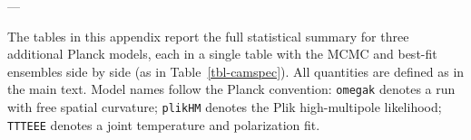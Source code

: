 \documentclass[apj,twocolumn,numberedappendix]{openjournal}
\begin{document}
\begin{appendix}
---


The tables in this appendix report the full statistical summary for
three additional Planck models, each in a single table with the MCMC
and best-fit ensembles side by side (as in Table~\ref{tbl-camspec}).
All quantities are defined as in the main text. Model names follow the
Planck convention: \texttt{omegak} denotes a run with free spatial
curvature; \texttt{plikHM} denotes the Plik high-multipole likelihood;
\texttt{TTTEEE} denotes a joint temperature and polarization fit.


\begin{table}[h!]
\centering
\caption{Statistical summary for \texttt{base\_plikHM\_TT\_lowl\_lowE}.}
\label{tbl-plikHM}
%
\end{table}

\begin{table}[h!]
\centering
\caption{Statistical summary for \texttt{base\_omegak\_CamSpecHM\_TT\_lowl\_lowE}.}
\label{tbl-omegak-camspec}
%
\end{table}

\begin{table}[h!]
\centering
\caption{Statistical summary for \texttt{base\_omegak\_plikHM\_TTTEEE\_lowl\_lowE}.}
\label{tbl-omegak-plikHM}
%
\end{table}

\end{appendix}
\end{document}
